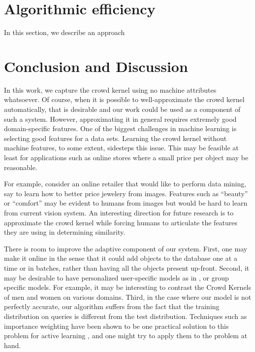 \documentclass{article}
\begin{document}
\section{Algorithmic efficiency}\label{sec:efficient}

In this section, we describe an approach 


\section{Conclusion and Discussion}
In this work, we capture the crowd kernel using no machine attributes whatsoever.  Of course, when it is possible to well-approximate the crowd kernel automatically, that is desirable and our work could be used as a component of such a system. However, approximating it in general requires extremely good domain-specific features.  One of the biggest challenges in machine learning is selecting good features for a data sets.  Learning the crowd kernel without machine features, to some extent, sidesteps this issue.  This may be feasible at least for applications such as online stores where a small price per object may be reasonable.

For example, consider an online retailer that would like to perform data mining, say to learn how to better price jewelery from images. Features such as ``beauty'' or ``comfort'' may be evident to humans from images but would be hard to learn from current vision system.  An interesting direction for future research is to approximate the crowd kernel while forcing humans to articulate the features they are using in determining similarity.  

There is room to improve the adaptive component of our system.  First, one may make it online in the sense that it could add objects to the database one at a time or in batches, rather than having all the objects present up-front.  Second, it may be desirable to have personalized user-specific models as in \cite{??}, or group specific models.  For example, it may be interesting to contrast the Crowd Kernels of men and women on various domains.  Third, in the case where our model is not perfectly accurate, our algorithm suffers from the fact that the training distribution on queries is different from the test distribution.  Techniques such as importance weighting have been shown to be one practical solution to this problem for active learning \cite{BDL09}, and one might try to apply them to the problem at hand.



\end{document}
